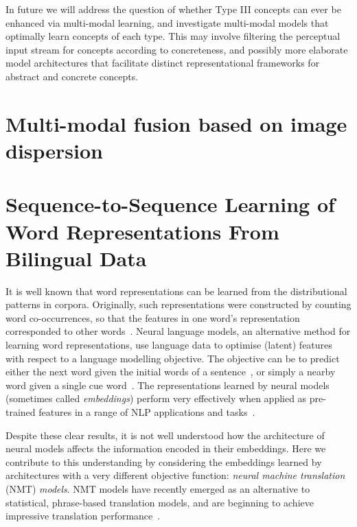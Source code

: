 In future we will address the question of whether Type III concepts can ever be enhanced via multi-modal learning, and investigate multi-modal models that optimally learn concepts of each type. This may involve filtering the perceptual input stream for concepts according to concreteness, and possibly more elaborate model architectures that facilitate distinct representational frameworks for abstract and concrete concepts.

 \section{Multi-modal fusion based on image dispersion}






\section{Sequence-to-Sequence Learning of Word Representations From Bilingual Data}


It is well known that word representations can be learned from the distributional patterns in corpora. Originally, such representations were constructed by counting word co-occurrences, so that the features in one word's representation corresponded to other words~\cite{landauer1997solution,turney2010frequency}. Neural language models, an alternative method for learning word representations, use language data to optimise (latent) features with respect to a language modelling objective. The objective can be to predict either the next word given the initial words of a sentence~\cite{Bengio2003lm,mnih2009scalable,collobert2008unified}, or simply a nearby word given a single cue word~\cite{mikolov2013distributed,Pennington2014}. The representations learned by neural models (sometimes called \emph{embeddings}) perform very effectively when applied as pre-trained features in a range of NLP applications and tasks~\cite{baroni2014don}. 

Despite these clear results, it is not well understood how the architecture of neural models affects the information encoded in their embeddings. Here we contribute to this understanding by considering the embeddings learned by architectures with a very different objective function: \emph{neural machine translation} (NMT) \emph{models}. NMT models have recently emerged as an alternative to statistical, phrase-based translation models, and are beginning to achieve impressive translation performance~\cite{kalchbrenner13emnlp,devlin2014fast,Sutskever2014sequence}.

